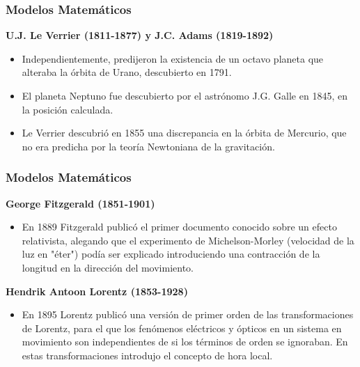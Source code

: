 \begin{frame}
\frametitle{Modelos Matemáticos}

\textbf{U.J. Le Verrier (1811-1877) y J.C. Adams (1819-1892)}

\begin{itemize}[<+->]

\item Independientemente, predijeron la existencia de un octavo planeta que alteraba la órbita de Urano, descubierto en 1791.
\item El planeta Neptuno fue descubierto por el astrónomo J.G. Galle en 1845, en la posición calculada.
\item Le Verrier descubrió en 1855 una discrepancia en la órbita de Mercurio, que no era predicha por la teoría Newtoniana de la gravitación.

\end{itemize}

\end{frame}









\begin{frame}
\frametitle{Modelos Matemáticos}

\textbf{George Fitzgerald (1851-1901)}

\begin{itemize}[<+->]

\item En 1889 Fitzgerald publicó el primer documento conocido sobre un efecto relativista, alegando que el experimento de Michelson-Morley (velocidad de la luz en "éter") podía ser explicado introduciendo una contracción de la longitud en la dirección del movimiento.

\end{itemize}

\textbf{Hendrik Antoon Lorentz (1853-1928)}

\begin{itemize}[<+->]

\item En 1895 Lorentz publicó una versión de primer orden de las transformaciones de Lorentz, para el que los fenómenos eléctricos y ópticos en un sistema en movimiento son independientes de si los términos de orden  se ignoraban. En estas transformaciones introdujo el concepto de hora local. 

\end{itemize}

\end{frame}












